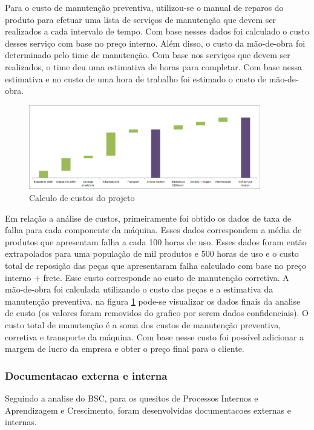 \documentclass[12pt]{article}
\begin{document}
	Para o custo de manutenção preventiva, utilizou-se o manual de reparos do produto para efetuar uma lista de serviços de manutenção que devem ser realizados a cada intervalo de tempo. Com base nesses dados foi calculado o custo desses serviço com base no preço interno. Além disso, o custo da mão-de-obra foi determinado pelo time de manutenção. Com base nos serviços que devem ser realizados, o time deu uma estimativa de horas para completar. Com base nessa estimativa e no custo de uma hora de trabalho foi estimado o custo de mão-de-obra.

\begin{figure}[h!]
	\centering
	\includegraphics[width=0.9\textwidth]{img/ws220-waterfall.png}
	\caption{Calculo de custos do projeto}
	\label{fig:ws-waterfall}
\end{figure}

	Em relação a análise de custos, primeiramente foi obtido os dados de taxa de falha para cada componente da máquina. Esses dados correspondem a média de produtos que apresentam falha a cada 100 horas de uso. Esses dados foram então extrapolados para uma população de mil produtos e 500 horas de uso e o custo total de reposição das peças que apresentaram falha calculado com base no preço interno + frete. Esse custo corresponde ao custo de manutenção corretiva. A mão-de-obra foi calculada utilizando o custo das peças e a estimativa da manutenção preventiva. na figura \ref{fig:ws-waterfall} pode-se visualizar os dados finais da analise de custo (os valores foram removidos do grafico por serem dados confidenciais). O custo total de manutenção é a soma dos custos de manutenção preventiva, corretiva e transporte da máquina. Com base nesse custo foi possível adicionar a margem de lucro da empresa e obter o preço final para o cliente.
	
\subsubsection{Documentacao externa e interna}

	Seguindo a analise do BSC, para os quesitos de Processos Internos e Aprendizagem e Crescimento, foram desenvolvidas documentacoes externas e internas.
\end{document}
